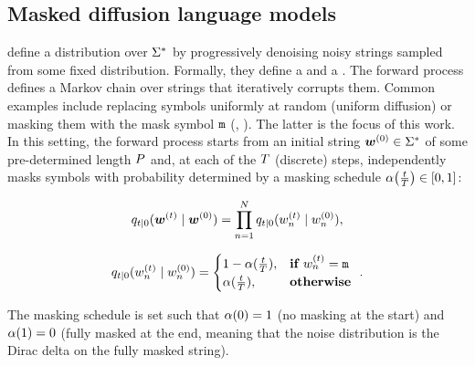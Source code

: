\documentclass{article} %
\begin{document}
\subsection{Masked diffusion language models} \label{sec:diffusion-language-models}
 define a distribution over ${{{{{{\Sigma}}^{*}}}}}$ by progressively denoising noisy strings sampled from some fixed distribution.
Formally, they define a  and a .
The forward process defines a Markov chain over strings that iteratively corrupts them. 
Common examples include replacing symbols uniformly at random (uniform diffusion) or masking them with the mask symbol ${\texttt{m}}$ (, \MDMsAcr).
The latter is the focus of this work.
In this setting, the forward process starts from an initial string ${{\boldsymbol{w}}}^{(0)} \in {{{{{{\Sigma}}^{*}}}}}$ of some pre-determined length ${P}$ and, at each of the ${T}$ (discrete) steps, independently masks symbols with probability determined by a masking schedule $\maskScheduleFun{\frac{t}{\timesteps}} \in [0, 1]$:
\begin{minipage}[t]{0.45\textwidth}
   \begin{equation*}
      {q}_{t|0}({{\boldsymbol{w}}}^{(t)} \mid {{\boldsymbol{w}}}^{(0)}) = \prod_{{{n}}=1}^{{{N}}} {q}_{t|0}({{w}}^{(t)}_{{n}} \mid {{w}}^{(0)}_{{n}}),
   \end{equation*}
\end{minipage}
\hfill
\begin{minipage}[t]{0.5\textwidth}
   \begin{equation*}
      {q}_{t|0}({{w}}^{(t)}_{{n}} \mid {{w}}^{(0)}_{{n}}) =
      \begin{cases}
         1 - {\alpha}(\frac{t}{{T}}), &\textbf{if }{{w}}^{(t)}_{{n}} = {\texttt{m}} \\
         {\alpha}(\frac{t}{{T}}), &\textbf{otherwise }
      \end{cases}.
   \end{equation*}
\end{minipage}
The masking schedule is set such that $\maskScheduleFun{0} = 1$ (no masking at the start) and $\maskScheduleFun{1} = 0$ (fully masked at the end, meaning that the noise distribution is the Dirac delta on the fully masked string).
\end{document}
